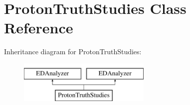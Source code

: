 \hypertarget{classProtonTruthStudies}{}\section{Proton\+Truth\+Studies Class Reference}
\label{classProtonTruthStudies}
Inheritance diagram for Proton\+Truth\+Studies\+:\begin{figure}[H]
\begin{center}
\leavevmode
\includegraphics[height=2.000000cm]{classProtonTruthStudies}
\end{center}
\end{figure}
